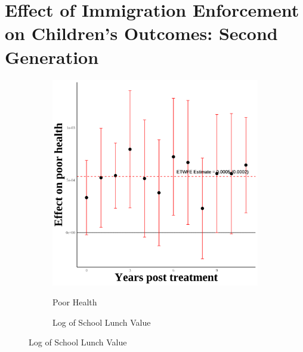 \documentclass[12pt,english]{article}
\begin{document}
\pagebreak

\section{Effect of Immigration Enforcement on Children's Outcomes: Second Generation}
\begin{figure}[H]
  \caption{Effect of Immigration Enforcement on Children's Outcomes: Second Generation}
  \centering

  \begin{subfigure}[b]{0.3\textwidth}
    \centering
    \caption{Poor Health}
    \includegraphics[width=\linewidth]{figures/plot17-poor_health_event_study-second.png}
    \label{fig:poor-health-second}
  \end{subfigure}
  \hfill
  \begin{subfigure}[b]{0.3\textwidth}
    \centering
    \caption{Log of School Lunch Value}

\end{subfigure}
\end{figure}
\end{document}

